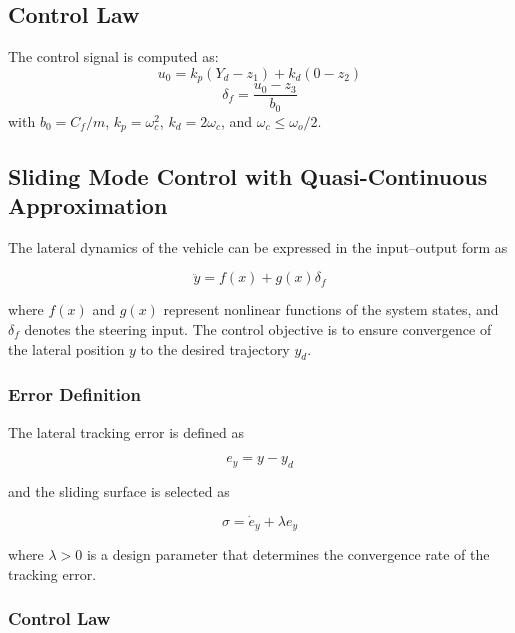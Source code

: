 \documentclass[letterpaper]{ifacconf}
\begin{document}
\subsection{Control Law}

The control signal is computed as:
%
\begin{equation}
u_0 = k_p(Y_d - z_1) + k_d(0 - z_2)
\label{eq:adrc_u0}
\end{equation}
%
\begin{equation}
    \boxed{
\delta_f = \frac{u_0 - z_3}{b_0}
    }
\label{eq:adrc_control}
\end{equation}
%
with $b_0 = C_f/m$, $k_p = \omega_c^2$, $k_d = 2\omega_c$, and $\omega_c \leq \omega_o/2$.
\subsection{Sliding Mode Control with Quasi-Continuous Approximation}

The lateral dynamics of the vehicle can be expressed in the input--output form as

\begin{equation}
\ddot{y}=f(x)+g(x)\delta_f
\end{equation}

where $f(x)$ and $g(x)$ represent nonlinear functions of the system states, and $\delta_f$ denotes the steering input. The control objective is to ensure convergence of the lateral position $y$ to the desired trajectory $y_d$.

\subsubsection{Error Definition}

The lateral tracking error is defined as

\begin{equation}
e_y = y-y_d
\end{equation}

and the sliding surface is selected as

\begin{equation}
\sigma = \dot{e}_y + \lambda e_y
\end{equation}

where $\lambda>0$ is a design parameter that determines the convergence rate of the tracking error.

\subsubsection{Control Law}
\end{document}
